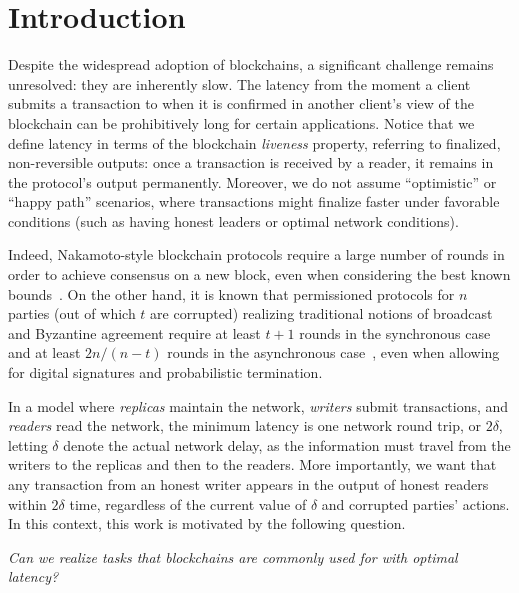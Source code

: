 \section{Introduction}
Despite the widespread adoption of blockchains, a significant challenge remains unresolved: they are inherently slow. The latency from the moment a client submits a transaction to when it is confirmed in another client's view of the blockchain can be prohibitively long for certain applications. Notice that we define latency in terms of the blockchain \emph{liveness} property, referring to finalized, non-reversible outputs: once a transaction is received by a reader, it remains in the protocol's output permanently.
Moreover, we do not assume ``optimistic'' or ``happy path'' scenarios, where transactions might finalize faster under favorable conditions (such as having honest leaders or optimal network conditions).


Indeed, Nakamoto-style blockchain protocols require a large number of rounds in order to achieve consensus on a new block, even when considering the best known bounds~\cite{DBLP:conf/crypto/GaziRR23}. On the other hand, it is known that permissioned protocols for $n$ parties (out of which $t$ are corrupted) realizing traditional notions of broadcast and Byzantine agreement require at least $t+1$ rounds in the synchronous case~\cite{DBLP:journals/ipl/AguileraT99} and at least $2n/(n-t)$ rounds in the asynchronous case~\cite{DBLP:conf/focs/GarayKKO07}, even when allowing for digital signatures and probabilistic termination.


In a model where \emph{replicas} maintain the network, \emph{writers} submit transactions, and \emph{readers} read the network, the minimum latency is one network round trip, or $2\delta$, letting $\delta$ denote the actual network delay, as the information must travel from the writers to the replicas and then to the readers. More importantly, we want that any transaction from an honest writer appears in the output of honest readers within $2\delta$ time, regardless of the current value of $\delta$ and corrupted parties' actions.
In this context, this work is motivated by the following question.


\begin{center}
	\emph{Can we realize tasks that blockchains are commonly used for with optimal latency?}
\end{center}

